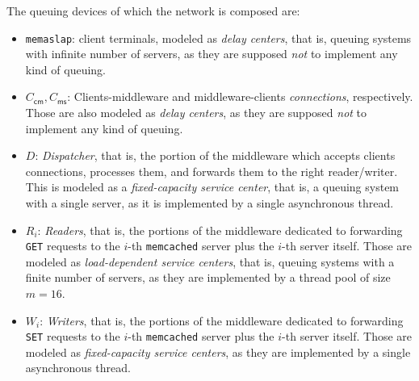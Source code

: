 \documentclass[11pt]{article}
\theoremstyle{definition}
\renewcommand\t\texttt
\begin{document}
\noindent The queuing devices of which the network is composed are:
\begin{itemize}
    \item \t{memaslap}: client terminals, modeled as \emph{delay centers}, that is, queuing systems with infinite number of servers, as they are supposed \emph{not} to implement any kind of queuing.
    \item $C_{\textsf{cm}},C_{\textsf{ms}}$: Clients-middleware and middleware-clients \emph{connections}, respectively. %
    Those are also modeled as \emph{delay centers}, as they are supposed \emph{not} to implement any kind of queuing.
    \item $D$: \emph{Dispatcher}, that is, the portion of the middleware which accepts clients connections, processes them, and forwards them to the right reader/writer.
    This is modeled as a \emph{fixed-capacity service center}, that is, a queuing system with a single server, as it is implemented by a single asynchronous thread.
    \item $R_i$: \emph{Readers}, that is, the portions of the middleware dedicated to forwarding \t{GET} requests to the $i$-th \t{memcached} server plus the $i$-th server itself.
    Those are modeled as \emph{load-dependent service centers}, that is, queuing systems with a finite number of servers, as they are implemented by a thread pool of size $m=16$.
    \item $W_i$: \emph{Writers}, that is, the portions of the middleware dedicated to forwarding \t{SET} requests to the $i$-th \t{memcached} server plus the $i$-th server itself.
    Those are modeled as \emph{fixed-capacity service centers}, as they are implemented by a single asynchronous thread.
\end{itemize}
\end{document}
